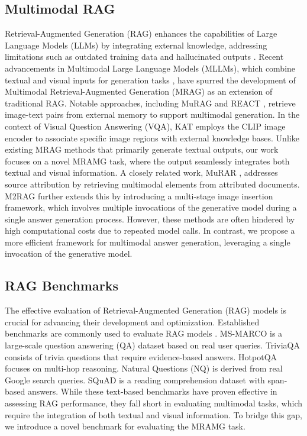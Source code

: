 \subsection{Multimodal RAG}
Retrieval-Augmented Generation (RAG) \citep{2020RAG, zhao2024retrieval} enhances the capabilities of Large Language Models (LLMs) by integrating external knowledge, addressing limitations such as outdated training data and hallucinated outputs \citep{hallucination, gupta2024rag}. Recent advancements in Multimodal Large Language Models (MLLMs), which combine textual and visual inputs for generation tasks \citep{wang2024comprehensive}, have spurred the development of Multimodal Retrieval-Augmented Generation (MRAG) as an extension of traditional RAG. Notable approaches, including MuRAG \citep{chen2022murag} and REACT \citep{liu2023learning}, retrieve image-text pairs from external memory to support multimodal generation. In the context of Visual Question Answering (VQA), KAT \citep{gui2021kat} employs the CLIP \citep{radford2021learning} image encoder to associate specific image regions with external knowledge bases. Unlike existing MRAG methods that primarily generate textual outputs, our work focuses on a novel MRAMG task, where the output seamlessly integrates both textual and visual information. A closely related work, MuRAR \citep{zhu2024murar}, addresses source attribution by retrieving multimodal elements from attributed documents. M2RAG \citep{ma2024multi} further extends this by introducing a multi-stage image insertion framework, which involves multiple invocations of the generative model during a single answer generation process. However, these methods are often hindered by high computational costs due to repeated model calls. In contrast, we propose a more efficient framework for multimodal answer generation, leveraging a single invocation of the generative model.
\vspace{-2mm}
\subsection{RAG Benchmarks}
The effective evaluation of Retrieval-Augmented Generation (RAG) models is crucial for advancing their development and optimization. 
Established benchmarks \citep{MSMARCO,joshi2017triviaqa,yang2018hotpotqa,Naturalquestions,rajpurkar2016squad} are commonly used to evaluate RAG models \citep{petroni2020kilt, QAE}. MS-MARCO \citep{MSMARCO} is a large-scale question answering (QA) dataset based on real user queries. TriviaQA \citep{joshi2017triviaqa} consists of trivia questions that require evidence-based answers. HotpotQA \citep{yang2018hotpotqa} focuses on multi-hop reasoning. Natural Questions (NQ) \citep{Naturalquestions} is derived from real Google search queries. SQuAD \citep{rajpurkar2016squad} is a reading comprehension dataset with span-based answers.
While these text-based benchmarks have proven effective in assessing RAG performance, they fall short in evaluating multimodal tasks, which require the integration of both textual and visual information. 
To bridge this gap, we introduce a novel benchmark for evaluating the MRAMG task.

